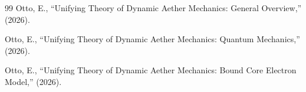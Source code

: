 ﻿\documentclass[12pt,letterpaper]{article}
\begin{document}
\begin{thebibliography}{99}
Otto, E.,
``Unifying Theory of Dynamic Aether Mechanics: General Overview,''
(2026).

Otto, E.,
``Unifying Theory of Dynamic Aether Mechanics: Quantum Mechanics,''
(2026).

Otto, E.,
``Unifying Theory of Dynamic Aether Mechanics: Bound Core Electron Model,''
(2026).
\end{thebibliography}
\end{document}
